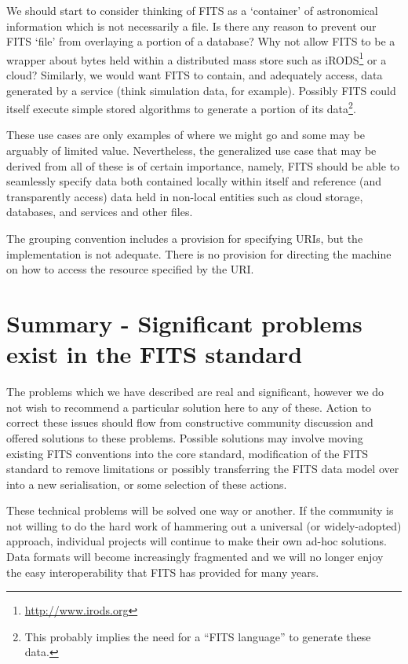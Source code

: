 \documentclass[final,authoryear,5p,times,twocolumn]{elsarticle}
\begin{document}
We should start to consider thinking of FITS as a `container' of
astronomical information which is not necessarily a file. Is there
any reason to prevent our FITS `file' from overlaying a portion of a
database? Why not allow FITS to be a wrapper about bytes held within a
distributed mass store such as
iRODS\footnote{\url{http://www.irods.org}} \citep[see e.g.][]{2007AGUFMIN13B1214R}
or a cloud? Similarly, we would
want FITS to contain, and adequately access, data generated by a
service (think simulation data, for example). Possibly FITS could
itself execute simple stored algorithms to generate a portion of its
data\footnote{This probably implies the need for a ``FITS language'' to generate these data.}.


These use cases are only examples of where we might go and some may be
arguably of limited value. Nevertheless, the generalized use case that
may be derived from all of these is of certain importance, namely,
FITS should be able to seamlessly specify data both contained locally
within itself and reference (and transparently access) data held in
non-local entities such as cloud storage, databases, and services and
other files.


The grouping convention includes a provision for specifying URIs,
but the implementation is not adequate. There is no provision for
directing the machine on how to access the resource specified by the
URI.


\section{Summary - Significant problems exist in the FITS standard}


The problems which we have described are real and significant, however
we do not wish to recommend a particular solution here to any of
these. Action to correct these issues should flow from constructive
community discussion and offered solutions to these problems. Possible
solutions may involve moving existing FITS conventions into the core
standard, modification of the FITS standard to remove limitations or
possibly transferring the FITS data model over into a new
serialisation, or some selection of these actions.


These technical problems will be solved one way or another. If the
community is not willing to do the hard work of hammering out a
universal (or widely-adopted) approach, individual projects will
continue to make their own ad-hoc solutions. Data formats will become
increasingly fragmented and we will no longer enjoy the easy
interoperability that FITS has provided for many years.
\end{document}
